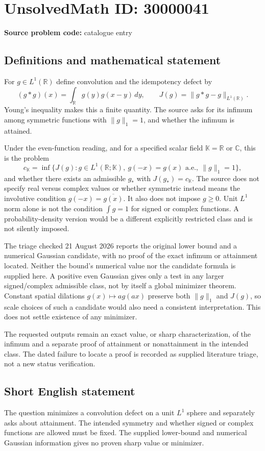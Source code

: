 \documentclass[11pt]{article}
\newcommand{\R}{\mathbb{R}}
\newcommand{\C}{\mathbb{C}}
\begin{document}
\section*{UnsolvedMath ID: 30000041}
\textbf{Source problem code:} catalogue entry
\subsection{Definitions and mathematical statement}
For $g\in L^1(\R)$ define convolution and the idempotency defect by
\[
 (g*g)(x)=\int_\R g(y)g(x-y)\,dy,
 \qquad J(g)=\|g*g-g\|_{L^1(\R)}.
\]
Young's inequality makes this a finite quantity. The source asks for its infimum among symmetric functions with $\|g\|_1=1$, and whether the infimum is attained.

Under the even-function reading, and for a specified scalar field $\mathbb K=\R$ or $\C$, this is the problem
\[
 c_{\mathbb K}=\inf\{J(g):g\in L^1(\R;\mathbb K),\
             g(-x)=g(x)\text{ a.e.},\ \|g\|_1=1\},
\]
and whether there exists an admissible $g_*$ with $J(g_*)=c_{\mathbb K}$. The source does not specify real versus complex values or whether symmetric instead means the involutive condition $g(-x)=\overline{g(x)}$. It also does not impose $g\geq0$. Unit $L^1$ norm alone is not the condition $\int g=1$ for signed or complex functions. A probability-density version would be a different explicitly restricted class and is not silently imposed.

The triage checked 21 August 2026 reports the original lower bound and a numerical Gaussian candidate, with no proof of the exact infimum or attainment located. Neither the bound's numerical value nor the candidate formula is supplied here. A positive even Gaussian gives only a test in any larger signed/complex admissible class, not by itself a global minimizer theorem. Constant spatial dilations $g(x)\mapsto a g(ax)$ preserve both $\|g\|_1$ and $J(g)$, so scale choices of such a candidate would also need a consistent interpretation. This does not settle existence of any minimizer.

The requested outputs remain an exact value, or sharp characterization, of the infimum and a separate proof of attainment or nonattainment in the intended class. The dated failure to locate a proof is recorded as supplied literature triage, not a new status verification.
\subsection{Short English statement}
The question minimizes a convolution defect on a unit $L^1$ sphere and separately asks about attainment. The intended symmetry and whether signed or complex functions are allowed must be fixed. The supplied lower-bound and numerical Gaussian information gives no proven sharp value or minimizer.
\end{document}
